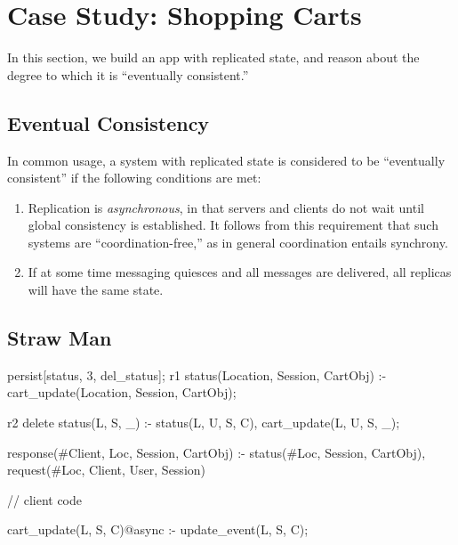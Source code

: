 \section{Case Study: Shopping Carts}

In this section, we build an app with replicated state, and reason about the degree to which
it is ``eventually consistent.'' 

\subsection{Eventual Consistency}

In common usage, a system with replicated state is considered to be ``eventually consistent'' 
if the following conditions are met:

\begin{enumerate}
\item Replication is \emph{asynchronous}, in that servers and clients do not wait until global consistency is established.  It follows from this requirement that such systems are ``coordination-free,'' as in general coordination entails synchrony. 
\item If at some time messaging quiesces and all messages are delivered, all replicas will have the same state.
\end{enumerate}

\subsection{Straw Man}

\begin{Dedalus}
persist[status, 3, del_status];
r1
status(Location, Session, CartObj) :-
    cart_update(Location,  Session, CartObj);
    
r2
delete status(L, S, _) :-
    status(L, U, S, C), cart_update(L, U, S, _);

response(#Client, Loc, Session, CartObj) :-
    status(#Loc, Session, CartObj),
    request(#Loc, Client, User, Session)

// client code

cart_update(L, S, C)@async :- 
    update_event(L, S, C);

\end{Dedalus}

